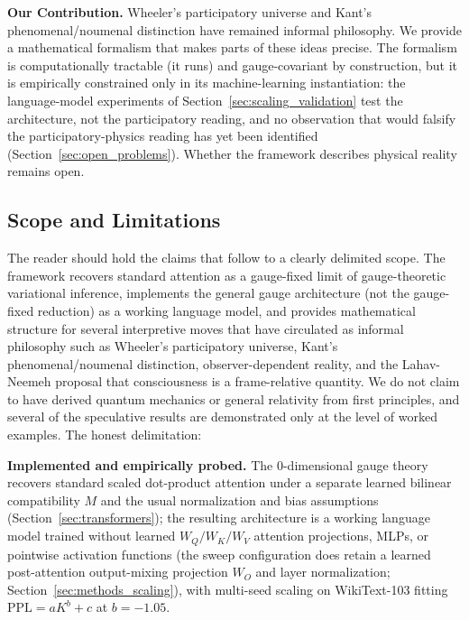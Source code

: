 \documentclass[11pt]{article}
\begin{document}
\textbf{Our Contribution.} Wheeler's participatory universe and Kant's phenomenal/noumenal distinction have remained informal philosophy. We provide a mathematical formalism that makes parts of these ideas precise. The formalism is computationally tractable (it runs) and gauge-covariant by construction, but it is empirically constrained only in its machine-learning instantiation: the language-model experiments of Section~\ref{sec:scaling_validation} test the architecture, not the participatory reading, and no observation that would falsify the participatory-physics reading has yet been identified (Section~\ref{sec:open_problems}). Whether the framework describes physical reality remains open.

\subsection{Scope and Limitations}
\label{sec:scope_limitations}

The reader should hold the claims that follow to a clearly delimited scope. The framework recovers standard attention as a gauge-fixed limit of gauge-theoretic variational inference, implements the general gauge architecture (not the gauge-fixed reduction) as a working language model, and provides mathematical structure for several interpretive moves that have circulated as informal philosophy such as  Wheeler's participatory universe, Kant's phenomenal/noumenal distinction, observer-dependent reality, and the Lahav-Neemeh proposal that consciousness is a frame-relative quantity. We do not claim to have derived quantum mechanics or general relativity from first principles, and several of the speculative results are demonstrated only at the level of worked examples. The honest delimitation:

\textbf{Implemented and empirically probed.} The 0-dimensional gauge theory recovers standard scaled dot-product attention under a separate learned bilinear compatibility $M$ and the usual normalization and bias assumptions (Section~\ref{sec:transformers}); the resulting architecture is a working language model trained without learned $W_Q/W_K/W_V$ attention projections, MLPs, or pointwise activation functions (the sweep configuration does retain a learned post-attention output-mixing projection $W_O$ and layer normalization; Section~\ref{sec:methods_scaling}), with multi-seed scaling on WikiText-103 fitting $\mathrm{PPL} = aK^b + c$ at $b = -1.05$.
\end{document}
